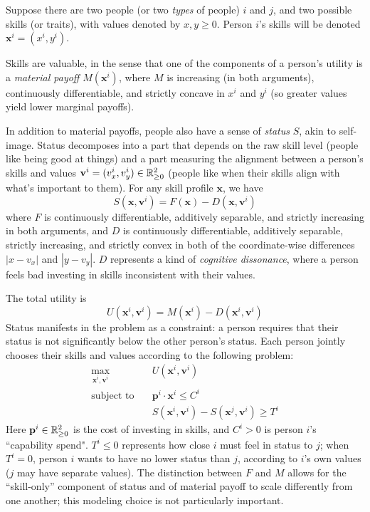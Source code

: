 \documentclass[../../../main.tex]{subfiles}
\begin{document}
\begin{definition}
    Suppose there are two people (or two \textit{types} of people) $i$ and $j$, and two possible skills (or traits), with values denoted by $x,y\geq 0$.
    Person $i$'s skills will be denoted $\mathbf{x}^i=(x^i,y^i)$.

    Skills are valuable, in the sense that one of the components of a person's utility is a \textit{material payoff} $M(\mathbf{x}^i)$, where $M$ is increasing (in both arguments), continuously differentiable, and strictly concave in $x^i$ and $y^i$ (so greater values yield lower marginal payoffs).

    In addition to material payoffs, people also have a sense of \textit{status} $S$, akin to self-image. 
    Status decomposes into a part that depends on the raw skill level (people like being good at things) and a part measuring the alignment between a person's skills and values $\mathbf{v}^i=(v_x^i,v_y^i)\in \mathbb{R}^2_{\geq 0}$ (people like when their skills align with what's important to them).
    For any skill profile $\mathbf{x}$, we have
    \begin{equation*}
        S(\mathbf{x},\mathbf{v}^i)=F(\mathbf{x})-D(\mathbf{x},\mathbf{v}^i)
    \end{equation*}
    where $F$ is continuously differentiable, additively separable, and strictly increasing in both arguments, and $D$ is continuously differentiable, additively separable, strictly increasing, and strictly convex in both of the coordinate-wise differences $|x-v_x|$ and $|y-v_y|$. 
    $D$ represents a kind of \textit{cognitive dissonance}, where a person feels bad investing in skills inconsistent with their values.

    The total utility is 
    \begin{equation*}
        U(\mathbf{x}^i,\mathbf{v}^i)=M(\mathbf{x}^i)-D(\mathbf{x}^i,\mathbf{v}^i)
    \end{equation*}
    Status manifests in the problem as a constraint: a person requires that their status is not significantly below the other person's status. 
    Each person jointly chooses their skills and values according to the following problem:
    \begin{align*}
        \max_{\mathbf{x}^i,\mathbf{v}^i} \quad &U(\mathbf{x}^i,\mathbf{v}^i)\\
        \textrm{subject to}\quad & \mathbf{p}^i\cdot \mathbf{x}^i\leq C^i\\
        & S(\mathbf{x}^i,\mathbf{v}^i)-S(\mathbf{x}^j,\mathbf{v}^i)\geq T^i
    \end{align*}
    Here $\mathbf{p}^i\in \mathbb{R}^2_{\geq 0}$ is the cost of investing in skills, and $C^i>0$ is person $i$'s ``capability spend".
    $T^i\leq 0$ represents how close $i$ must feel in status to $j$; when $T^i=0$, person $i$ wants to have no lower status than $j$, according to $i$'s own values ($j$ may have separate values).
    The distinction between $F$ and $M$ allows for the ``skill-only'' component of status and of material payoff to scale differently from one another; this modeling choice is not particularly important.


\end{definition}
\end{document}
